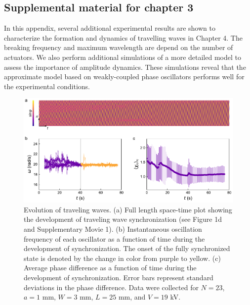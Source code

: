 \begin{appendices}



\chapter{Supplemental material for chapter 3}

In this appendix, several additional experimental results are shown to characterize the formation and dynamics of travelling waves in Chapter 4. The breaking frequency and maximum wavelength are depend on the number of actuators. We also perform additional simulations of a more detailed model to assess the importance  of  amplitude  dynamics.  These simulations  reveal  that  the  approximate  model  based  on  weakly-coupled  phase  oscillators performs well for the experimental conditions.

\begin{figure}[p]
    \centering
    \includegraphics{figures/A2_SI1-v3.pdf}
    \caption{Evolution of traveling waves. (a) Full length space-time plot showing the development of traveling wave synchronization (see Figure 1d and Supplementary Movie 1). (b) Instantaneous oscillation frequency of each oscillator as a function of time during the development of synchronization. The onset of the fully synchronized state is denoted by the change in color from purple to yellow. (c) Average phase difference as a function of time during the development of synchronization. Error bars represent standard deviations in the phase difference. Data were collected for $N=23$, $a=1$ mm, $W=3$ mm, $L=25$ mm, and $V=19$ kV.}
    \label{fig:SI1}
\end{figure}



\end{appendices}

